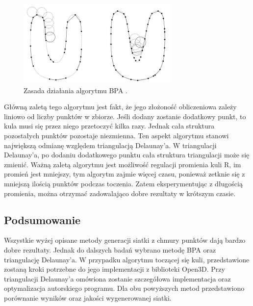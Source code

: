 \begin{figure}[H]
  \centering
  \includegraphics[scale=0.8]{bpa_zasada.PNG}
  \caption{Zasada działania algorytmu BPA \cite{bernardini1999ball}.}   
  \label{fig:bpaZasada}
\end{figure}
Główną zaletą tego algorytmu jest fakt, że jego złożoność obliczeniowa zależy liniowo od liczby punktów w zbiorze. Jeśli dodany zostanie dodatkowy punkt, to kula musi się przez niego przetoczyć kilka razy. Jednak cała struktura pozostałych punktów pozostaje niezmienna. Ten aspekt algorytmu stanowi największą odmianę względem triangulacją Delaunay'a. W triangulacji Delaunay'a, po dodaniu dodatkowego punktu cała struktura triangulacji może się zmienić. Ważną zaletą algorytmu jest możliwość regulacji promienia kuli R, im promień jest mniejszy, tym algorytm zajmie więcej czasu, ponieważ zetknie się z mniejszą ilością punktów podczas toczenia. Zatem eksperymentując z długością promienia, można otrzymać zadowalająco dobre rezultaty w krótszym czasie. 
\subsection{Podsumowanie}
Wszystkie wyżej opisane metody generacji siatki z chmury punktów dają bardzo dobre rezultaty. Jednak do dalszych badań wybrano metodę BPA oraz triangulację Delaunay'a. W przypadku algorytmu toczącej się kuli, przedstawione zostaną kroki potrzebne do jego implementacji z biblioteki Open3D. Przy triangulacji Delaunay'a omówiona zostanie szczegółowa implementacja oraz optymalizacja autorskiego programu. Dla obu powyższych metod przedstawiono porównanie wyników oraz jakości wygenerowanej siatki.



